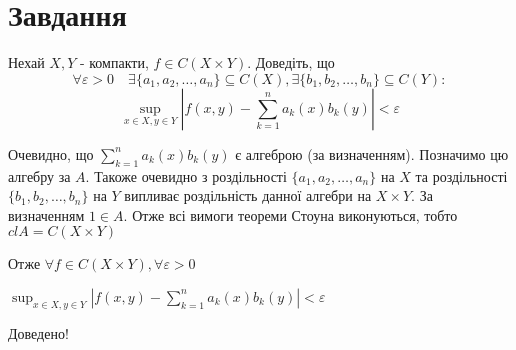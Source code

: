 
\chapter{Завдання \theHchapter}

\begin{tcolorbox}[title=Завдання]
    Нехай $X, Y$ - компакти, $f \in C(X \times Y)$. Доведіть, що
    $$\forall \varepsilon>0 \quad \exists\{a_1, a_2, \ldots, a_n\} 
    \subseteq C(X), \exists\{b_1, b_2, \ldots, b_n\} \subseteq C(Y):$$
    $$\sup _{x \in X, y \in Y}|f(x, y)-
    \sum_{k=1}^n a_k(x) b_k(y)| <\varepsilon$$
\end{tcolorbox}


Очевидно, що $\sum\limits_{k=1}^n a_k(x) b_k(y)$ 
є алгеброю (за визначенням).
Позначимо цю алгебру за $A$.
Такоже очевидно з роздільності $\{a_1, a_2, \ldots, a_n\}$ на $X$
та роздільності  $\{b_1, b_2, \ldots, b_n\}$ на $Y$ випливає 
роздільність данної алгебри на $X \times Y$.
За визначенням $1 \in A$.
Отже всі вимоги теореми Стоуна виконуються, тобто
$clA = C(X \times Y)$


Отже 
$\forall f \in C(X \times Y), \forall \varepsilon > 0$


$ \sup _{x \in X, y \in Y}|f(x, y)- 
\sum_{k=1}^n a_k(x) b_k(y)| <\varepsilon $


Доведено!


